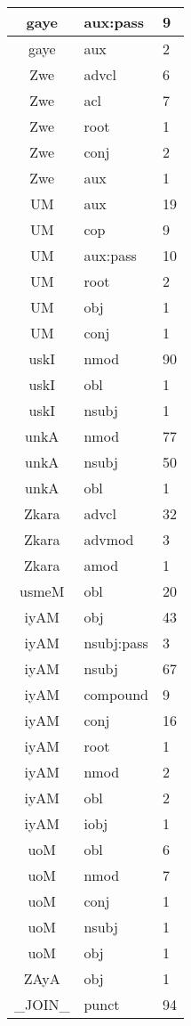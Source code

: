 \documentclass[a4 paper]{article}
\begin{document}
\begin{longtable}{cp{}p{}}
gaye & aux:pass & 9\\ \midrule gaye & aux & 2\\ \midrule 
Zwe & advcl & 6\\ \midrule Zwe & acl & 7\\ \midrule Zwe & root & 1\\ \midrule Zwe & conj & 2\\ \midrule Zwe & aux & 1\\ \midrule 
UM & aux & 19\\ \midrule UM & cop & 9\\ \midrule UM & aux:pass & 10\\ \midrule UM & root & 2\\ \midrule UM & obj & 1\\ \midrule UM & conj & 1\\ \midrule 
uskI & nmod & 90\\ \midrule uskI & obl & 1\\ \midrule uskI & nsubj & 1\\ \midrule 
unkA & nmod & 77\\ \midrule unkA & nsubj & 50\\ \midrule unkA & obl & 1\\ \midrule 
Zkara & advcl & 32\\ \midrule Zkara & advmod & 3\\ \midrule Zkara & amod & 1\\ \midrule 
usmeM & obl & 20\\ \midrule 
iyAM & obj & 43\\ \midrule iyAM & nsubj:pass & 3\\ \midrule iyAM & nsubj & 67\\ \midrule iyAM & compound & 9\\ \midrule iyAM & conj & 16\\ \midrule iyAM & root & 1\\ \midrule iyAM & nmod & 2\\ \midrule iyAM & obl & 2\\ \midrule iyAM & iobj & 1\\ \midrule 
uoM & obl & 6\\ \midrule uoM & nmod & 7\\ \midrule uoM & conj & 1\\ \midrule uoM & nsubj & 1\\ \midrule uoM & obj & 1\\ \midrule 
ZAyA & obj & 1\\ \midrule 
\_JOIN\_ & punct & 94\\ \midrule 

\end{longtable}
\end{document}
